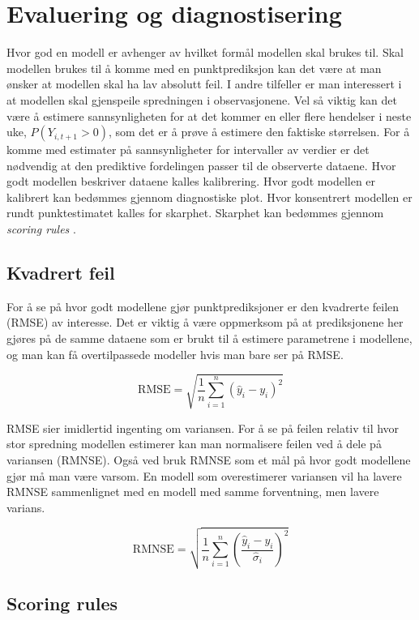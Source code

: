 \section{Evaluering og diagnostisering}

Hvor god en modell er avhenger av hvilket formål modellen skal brukes til. Skal
modellen brukes til å komme med en punktprediksjon kan det være at man ønsker
at modellen skal ha lav absolutt feil. I andre tilfeller er man interessert i at
modellen skal gjenspeile spredningen i observasjonene. Vel så viktig kan det
være å estimere sannsynligheten for at det kommer en eller flere hendelser i
neste uke, $P(Y_{i, t+1} > 0)$, som det er å prøve å estimere den faktiske
størrelsen. For å komme med estimater på sannsynligheter for intervaller av
verdier er det nødvendig at den prediktive fordelingen passer til de observerte
dataene. Hvor godt modellen beskriver dataene kalles kalibrering. Hvor godt
modellen er kalibrert kan bedømmes gjennom diagnostiske plot. Hvor konsentrert
modellen er rundt punktestimatet kalles for skarphet. Skarphet kan bedømmes
gjennom \textit{scoring rules} \parencite{czado2009predictive}. 


\subsection{Kvadrert feil}

For å se på hvor godt modellene gjør punktprediksjoner er den kvadrerte feilen
(RMSE) av interesse.  Det er viktig å være oppmerksom på at prediksjonene her
gjøres på de samme dataene som er brukt til å estimere parametrene i modellene,
og man kan få overtilpassede modeller hvis man bare ser på RMSE.  

$$
\mathrm{RMSE}=\sqrt{\frac{1}{n}\sum_{i=1}^n(\hat{y}_i-y_i)^2}
$$

RMSE sier imidlertid ingenting om variansen. For å se på feilen relativ til
hvor stor spredning modellen estimerer kan man normalisere feilen ved å dele på
variansen (RMNSE). Også ved bruk RMNSE som et mål på hvor godt modellene gjør
må man være varsom. En modell som overestimerer variansen vil ha lavere RMNSE
sammenlignet med en modell med samme forventning, men lavere varians.

$$
\mathrm{RMNSE}=\sqrt{\frac{1}{n}\sum_{i=1}^n \left(\frac{\hat{y}_i-y_i}{\hat{\sigma}_i}\right)^2}
$$

\subsection{Scoring rules}

